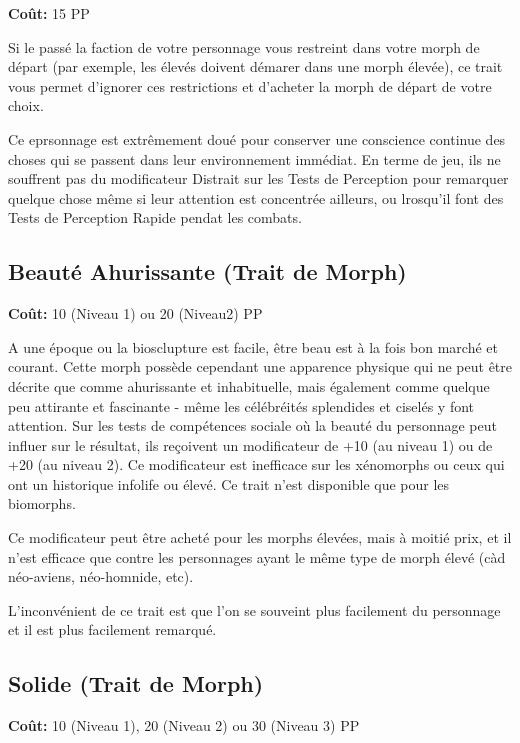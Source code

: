 \textbf{Coût:} 15 PP 

Si le passé la faction de votre personnage vous restreint dans votre morph de départ (par exemple, les élevés doivent démarer dans une morph élevée), ce trait vous permet d'ignorer ces restrictions et d'acheter la morph de départ de votre choix. 





Ce eprsonnage est extrêmement doué pour conserver une conscience continue des choses qui se passent dans leur environnement immédiat. En terme de jeu, ils ne souffrent pas du modificateur Distrait sur les Tests de Perception pour remarquer quelque chose même si leur attention est concentrée ailleurs, ou lrosqu'il font des Tests de Perception Rapide pendat les combats. 

\subsection{Beauté Ahurissante (Trait de Morph)} \label{sec:traits-striking-looks} 

\textbf{Coût:} 10 (Niveau 1) ou 20 (Niveau2) PP 

A une époque ou la biosclupture est facile, être beau est à la fois bon marché et courant. Cette morph possède cependant une apparence physique qui ne peut être décrite que comme ahurissante et inhabituelle, mais également comme quelque peu attirante et fascinante - même les célébréités splendides et ciselés y font attention. Sur les tests de compétences sociale où la beauté du personnage peut influer sur le résultat, ils reçoivent un modificateur de +10 (au niveau 1) ou de +20 (au niveau 2). Ce modificateur est inefficace sur les xénomorphs ou ceux qui ont un historique infolife ou élevé. Ce trait n'est disponible que pour les biomorphs. 

Ce modificateur peut être acheté pour les morphs élevées, mais à moitié prix, et il n'est efficace que contre les personnages ayant le même type de morph élevé (càd néo-aviens, néo-homnide, etc). 

L'inconvénient de ce trait est que l'on se souveint plus facilement du personnage et il est plus facilement remarqué. 

\subsection{Solide (Trait de Morph)} \label{sec:traits-tough} 

\textbf{Coût:} 10 (Niveau 1), 20 (Niveau 2) ou 30 (Niveau 3) PP 

